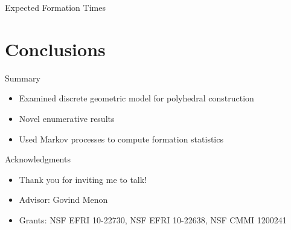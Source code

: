 \documentclass{beamer}
\begin{document}
\begin{frame}{Expected Formation Times}
  \centering
\end{frame}






\section{Conclusions}
\begin{frame}{Summary}
\begin{itemize}
  \item Examined discrete geometric model for polyhedral construction
  \item Novel enumerative results
  \item Used Markov processes to compute formation statistics
\end{itemize}
\end{frame}
\begin{frame}{Acknowledgments}
\begin{itemize}
\item Thank you for inviting me to talk! 
\item Advisor: Govind Menon
\item Grants: NSF EFRI 10-22730, NSF EFRI 10-22638, NSF CMMI 1200241
\end{itemize}
\end{frame}
\end{document}
